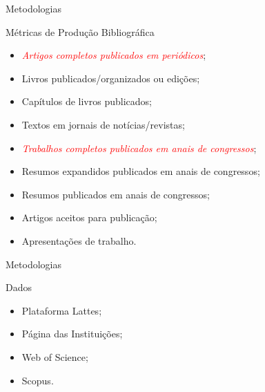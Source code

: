 \documentclass{beamer}
\begin{document}
\begin{frame} {Metodologias}

\begin{block}{Métricas de Produção Bibliográfica}
\begin{itemize}
\item \textit{\textcolor{red}{Artigos completos publicados em periódicos}};
\item Livros publicados/organizados ou edições;
\item Capítulos de livros publicados;
\item Textos em jornais de notícias/revistas;
\item \textit{\textcolor{red}{Trabalhos completos publicados em anais de congressos}};
\item Resumos expandidos publicados em anais de congressos;
\item Resumos publicados em anais de congressos;
\item Artigos aceitos para publicação;
\item Apresentações de trabalho. 
\end{itemize}
\end{block}

\end{frame}

\begin{frame} {Metodologias}

\begin{block}{Dados}
\begin{itemize}
\item Plataforma Lattes;
\item Página das Instituições;
\item Web of Science;
\item Scopus.
\end{itemize}
\end{block}

\end{frame}

\end{document}
